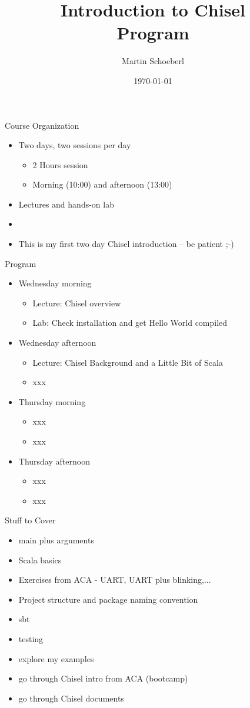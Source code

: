 \documentclass[xcolor=pdflatex,dvipsnames,table]{beamer}
\title{Introduction to Chisel\\Program}
\author{Martin Schoeberl}
\date{\today}
\institute{DTU Compute}
\begin{document}
\begin{frame}
\titlepage
\end{frame}


\begin{frame}[fragile]{Course Organization}
\begin{itemize}
\item Two days, two sessions per day
\begin{itemize}
\item 2 Hours session
\item Morning (10:00) and afternoon (13:00)
\end{itemize}
\item Lectures and hands-on lab
\item 
\item This is my first two day Chisel introduction -- be patient ;-)
\end{itemize}
\end{frame}

\begin{frame}[fragile]{Program}
\begin{itemize}
\item Wednesday morning
\begin{itemize}
\item Lecture: Chisel overview
\item Lab: Check installation and get Hello World compiled
\end{itemize}
\item Wednesday afternoon
\begin{itemize}
\item Lecture: Chisel Background and a Little Bit of Scala 
\item xxx
\end{itemize}
\item Thursday morning
\begin{itemize}
\item xxx
\item xxx
\end{itemize}
\item Thursday afternoon
\begin{itemize}
\item xxx
\item xxx
\end{itemize}
\end{itemize}
\end{frame}

\begin{frame}[fragile]{Stuff to Cover}
\begin{itemize}
\item main plus arguments
\item Scala basics
\item Exercises from ACA - UART, UART plus blinking,...
\item Project structure and package naming convention
\item sbt
\item testing
\item explore my examples
\item go through Chisel intro from ACA (bootcamp)
\item go through Chisel documents
\end{itemize}
\end{frame}
\end{document}
